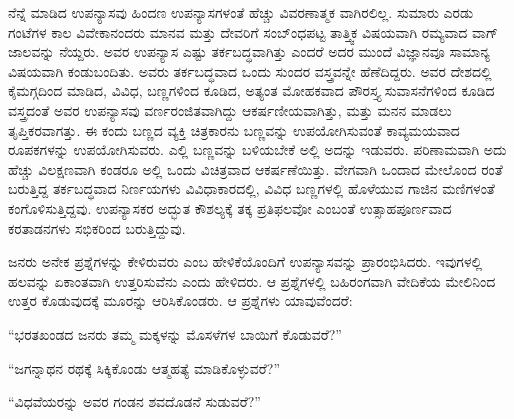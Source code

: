 ನೆನ್ನೆ ಮಾಡಿದ ಉಪನ್ಯಾಸವು ಹಿಂದಣ ಉಪನ್ಯಾಸಗಳಂತೆ ಹೆಚ್ಚು ವಿವರಣಾತ್ಮಕ ವಾಗಿರಲಿಲ್ಲ. ಸುಮಾರು ಎರಡು ಗಂಟೆಗಳ ಕಾಲ ವಿವೇಕಾನಂದರು ಮಾನವ ಮತ್ತು ದೇವರಿಗೆ ಸಂಬ್ಂಧಪಟ್ಟ ತಾತ್ತ್ವಿಕ ವಿಷಯವಾಗಿ ರಮ್ಯವಾದ ವಾಗ್​ಜಾಲವನ್ನು ನೆಯ್ದರು. ಅವರ ಉಪನ್ಯಾಸ ಎಷ್ಟು ತರ್ಕಬದ್ಧವಾಗಿತ್ತು ಎಂದರೆ ಅದರ ಮುಂದೆ ವಿಜ್ಞಾನವೂ ಸಾಮಾನ್ಯ ವಿಷಯವಾಗಿ ಕಂಡುಬಂದಿತು. ಅವರು ತರ್ಕಬದ್ಧವಾದ ಒಂದು ಸುಂದರ ವಸ್ತ್ರವನ್ನೇ ಹೆಣೆದಿದ್ದರು. ಅವರ ದೇಶದಲ್ಲಿ ಕೈಮಗ್ಗದಿಂದ ಮಾಡಿದ, ವಿವಿಧ, ಬಣ್ಣಗಳಿಂದ ಕೂಡಿದ, ಅತ್ಯಂತ ಮೋಹಕವಾದ ಪೌರಸ್ತ್ಯ ಸುವಾಸನೆಗಳಿಂದ ಕೂಡಿದ ವಸ್ತ್ರದಂತೆ ಅವರ ಉಪನ್ಯಾಸವು ವರ್ಣರಂಜಿತವಾಗಿದ್ದು ಆಕರ್ಷಣೀಯವಾಗಿತ್ತು, ಮತ್ತು ಮನನ ಮಾಡಲು ತೃಪ್ತಿಕರವಾಗತ್ತು. ಈ ಕಂದು ಬಣ್ಣದ ವ್ಯಕ್ತಿ ಚಿತ್ರಕಾರನು ಬಣ್ಣವನ್ನು ಉಪಯೋಗಿಸುವಂತೆ ಕಾವ್ಯಮಯವಾದ ರೂಪಕಗಳನ್ನು ಉಪಯೋಗಿಸುವರು. ಎಲ್ಲಿ ಬಣ್ಣವನ್ನು ಬಳಿಯಬೇಕೆ ಅಲ್ಲಿ ಅದನ್ನು ಇಡುವರು. ಪರಿಣಾಮವಾಗಿ ಅದು ಹೆಚ್ಚು ವಿಲಕ್ಷಣವಾಗಿ ಕಂಡರೂ ಅಲ್ಲಿ ಒಂದು ವಿಚಿತ್ರವಾದ ಆಕರ್ಷಣೆಯಿತ್ತು. ವೇಗವಾಗಿ ಒಂದಾದ ಮೇಲೊಂದ ರಂತೆ ಬರುತ್ತಿದ್ದ ತರ್ಕಬದ್ಧವಾದ ನಿರ್ಣಯಗಳು ವಿವಿಧಾಕಾರದಲ್ಲಿ, ವಿವಿಧ ಬಣ್ಣಗಳಲ್ಲಿ ಹೊಳೆಯುವ ಗಾಜಿನ ಮಣಿಗಳಂತೆ ಕಂಗೊಳಿಸುತ್ತಿದ್ದವು. ಉಪನ್ಯಾಸಕರ ಅದ್ಭುತ ಕೌಶಲ್ಯಕ್ಕೆ ತಕ್ಕ ಪ್ರತಿಫಲವೋ ಎಂಬಂತೆ ಉತ್ಸಾಹಪೂರ್ಣವಾದ ಕರತಾಡನಗಳು ಸಭಿಕರಿಂದ ಬರುತ್ತಿದ್ದುವು.

ಜನರು ಅನೇಕ ಪ್ರಶ್ನೆಗಳನ್ನು ಕೇಳಿರುವರು ಎಂಬ ಹೇಳಿಕೆಯೊಂದಿಗೆ ಉಪನ್ಯಾಸವನ್ನು ಪ್ರಾರಂಭಿಸಿದರು. ಇವುಗಳಲ್ಲಿ ಹಲವನ್ನು ಏಕಾಂತವಾಗಿ ಉತ್ತರಿಸುವೆನು ಎಂದು ಹೇಳಿದರು. ಆ ಪ್ರಶ್ನೆಗಳಲ್ಲಿ ಬಹಿರಂಗವಾಗಿ ವೇದಿಕೆಯ ಮೇಲಿನಿಂದ ಉತ್ತರ ಕೊಡುವುದಕ್ಕೆ ಮೂರನ್ನು ಆರಿಸಿಕೊಂಡರು. ಆ ಪ್ರಶ್ನೆಗಳು ಯಾವುವೆಂದರೆ:

\begin{myquote}
“ಭರತಖಂಡದ ಜನರು ತಮ್ಮ ಮಕ್ಕಳನ್ನು ಮೊಸಳೆಗಳ ಬಾಯಿಗೆ ಕೊಡುವರೆ?”
\end{myquote}

\begin{myquote}
“ಜಗನ್ನಾಥನ ರಥಕ್ಕೆ ಸಿಕ್ಕಿಕೊಂಡು ಆತ್ಮಹತ್ಯೆ ಮಾಡಿಕೊಳ್ಳುವರೆ?”
\end{myquote}

\begin{myquote}
“ವಿಧವೆಯರನ್ನು ಅವರ ಗಂಡನ ಶವದೊಡನೆ ಸುಡುವರೆ?”
\end{myquote}

